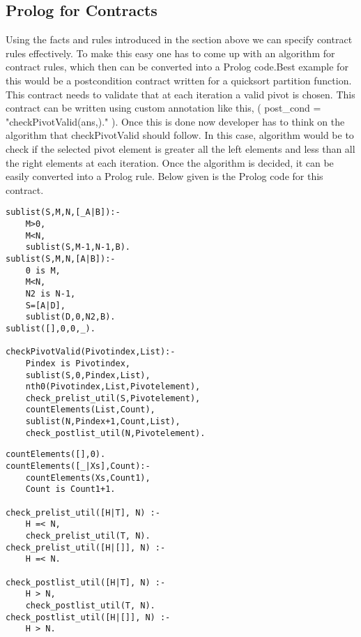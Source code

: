 \subsection{Prolog for Contracts}

Using the facts and rules introduced in the section above we can specify contract rules effectively. To make this easy one has to come up with an algorithm for contract rules, which then can be converted into a Prolog code.Best example for this would be a postcondition contract written for a quicksort partition function. This contract needs to validate that at each iteration a valid pivot is chosen. This contract can be written using custom annotation like this, \@Contract( post\_cond = { "checkPivotValid(ans,\@arr)." }). 
Once this is done now developer has to think on the algorithm that checkPivotValid should follow. In this case, algorithm would be to check if the selected pivot element is greater all the left elements and less than all the right elements at each iteration. Once the algorithm is decided, it can be easily converted into a Prolog rule. Below given is the Prolog code for this contract.

\begin{minipage}{\linewidth}
\lstset{caption=Prolog example, captionpos=b, breaklines=true}       
\begin{lstlisting}[frame=single]
sublist(S,M,N,[_A|B]):- 
	M>0, 
	M<N, 
	sublist(S,M-1,N-1,B).	
sublist(S,M,N,[A|B]):- 
	0 is M, 
	M<N, 
	N2 is N-1, 
	S=[A|D], 
	sublist(D,0,N2,B).	
sublist([],0,0,_).

checkPivotValid(Pivotindex,List):-
	Pindex is Pivotindex,
	sublist(S,0,Pindex,List),
	nth0(Pivotindex,List,Pivotelement),
	check_prelist_util(S,Pivotelement),
	countElements(List,Count),
	sublist(N,Pindex+1,Count,List),
	check_postlist_util(N,Pivotelement).
\end{lstlisting}
\end{minipage}

\begin{minipage}{\linewidth}
\lstset{caption=Prolog example, captionpos=b, breaklines=true}       
\begin{lstlisting}[frame=single]
countElements([],0).	
countElements([_|Xs],Count):-
	countElements(Xs,Count1),
	Count is Count1+1.

check_prelist_util([H|T], N) :-
    H =< N,
    check_prelist_util(T, N).	
check_prelist_util([H|[]], N) :-
    H =< N.
	
check_postlist_util([H|T], N) :-
    H > N,
    check_postlist_util(T, N).	
check_postlist_util([H|[]], N) :-
    H > N.
\end{lstlisting}
\end{minipage}


